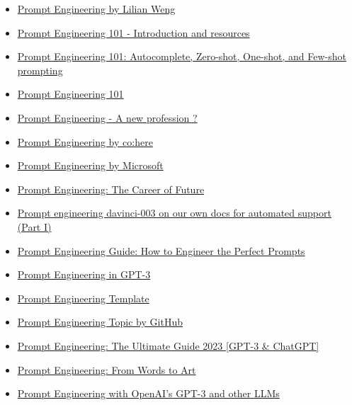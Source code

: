 \begin{itemize}
  \item \href{https://lilianweng.github.io/posts/2023-03-15-prompt-engineering/}{Prompt Engineering by Lilian Weng}
  \item \href{https://www.linkedin.com/pulse/prompt-engineering-101-introduction-resources-amatriain}{Prompt Engineering 101 - Introduction and resources}
  \item \href{https://youtube.com/watch?v=v2gD8BHOaX4&feature=shares}{Prompt Engineering 101: Autocomplete, Zero-shot, One-shot, and Few-shot prompting}
  \item \href{https://humanloop.com/blog/prompt-engineering-101}{Prompt Engineering 101}
  \item \href{https://www.youtube.com/watch?v=w102J3_9Bcs&ab_channel=PatrickDebois}{Prompt Engineering - A new profession ?}
  \item \href{https://docs.cohere.ai/docs/prompt-engineering}{Prompt Engineering by co:here}
  \item \href{https://microsoft.github.io/prompt-engineering}{Prompt Engineering by Microsoft}
  \item \href{https://shubhamsaboo111.medium.com/prompt-engineering-the-career-of-future-2fb93f90f117}{Prompt Engineering: The Career of Future}
  \item \href{https://www.patterns.app/blog/2022/12/21/finetune-llm-tech-support}{Prompt engineering davinci-003 on our own docs for automated support (Part I)}
  \item \href{https://richardbatt.co.uk/prompt-engineering-guide-how-to-engineer-the-perfect-prompts}{Prompt Engineering Guide: How to Engineer the Perfect Prompts}
  \item \href{https://www.analyticsvidhya.com/blog/2022/05/prompt-engineering-in-gpt-3}{Prompt Engineering in GPT-3}
  \item \href{https://docs.google.com/spreadsheets/d/1-snKDn38-KypoYCk9XLPg799bHcNFSBAVu2HVvFEAkA/edit#gid=0}{Prompt Engineering Template}
  \item \href{https://github.com/topics/prompt-engineering}{Prompt Engineering Topic by GitHub}
  \item \href{https://businessolution.org/prompt-engineering/}{Prompt Engineering: The Ultimate Guide 2023 [GPT-3 \& ChatGPT]}
  \item \href{https://www.saxifrage.xyz/post/prompt-engineering}{Prompt Engineering: From Words to Art}
  \item \href{https://youtube.com/watch?v=BP9fi_0XTlw&feature=shares}{Prompt Engineering with OpenAI's GPT-3 and other LLMs}

\end{itemize}

